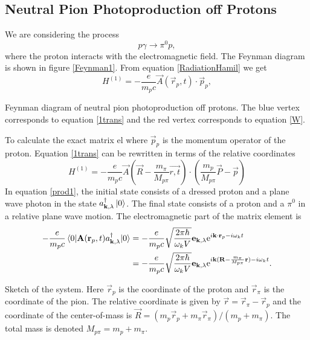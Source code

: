 \subsection{Neutral Pion Photoproduction off Protons}\label{sec:NeutralOffProton}
We are considering the process
\begin{equation} \label{prod1}
	p\gamma \rightarrow \pi^0 p,
\end{equation}
where the proton interacts with the electromagnetic field. The Feynman diagram is shown in figure \ref{Feynman1}. From equation \eqref{RadiationHamil} we get
\begin{equation} \label{1trans}
	H^{(1)} = -\frac{e}{m_pc} \vec{A}(\vec{r}_p,t)\cdot \vec{p}_p,
\end{equation}
\begin{marginfigure}
	\centering
	
	\caption{Feynman diagram of neutral pion photoproduction off protons. The blue vertex corresponds to equation \eqref{1trans} and the red vertex corresponds to equation \eqref{W}.}
	\label{Feynman1}
\end{marginfigure} 
To calculate the exact matrix el
where $\vec{p}_p$ is the momentum operator of the proton.  Equation \eqref{1trans} can be rewritten in terms of the relative coordinates
\begin{equation} \label{1rela}
	H^{(1)} = -\frac{e}{m_p c}\vec{A}\left( \vec{R}-\frac{m_\pi}{M_{p\pi}}\vec{r,t}\right) \cdot \left( \frac{m_p}{M_{p\pi}}\vec{P}-\vec{p}\right)
\end{equation}
In equation \eqref{prod1}, the initial state consists of a dressed proton and a plane wave photon in the state $a_{\bm{\mathrm{k}},\lambda}^\dagger\ket{0}$. The final state consists of a proton and a $\pi^0$ in a relative plane wave motion. The electromagnetic part of the matrix element is
\begin{align} \label{eletrans}
	-\frac{e}{m_p c}\mel{0}{\bm{\mathrm{A}}(\bm{\mathrm{r}}_p,t)a^\dagger_{\bm{\mathrm{k}},\lambda}}{0} &= -\frac{e}{m_p c}\sqrt{\frac{2\pi\hbar}{\omega_k V}}\bm{\mathrm{e}}_{\bm{\mathrm{k}},\lambda} \text{e}^{i\bm{\mathrm{k}}\cdot \bm{\mathrm{r}}_p-i\omega_k t} \\
	&=  -\frac{e}{m_p c}\sqrt{\frac{2\pi\hbar}{\omega_k V}}\bm{\mathrm{e}}_{\bm{\mathrm{k}},\lambda} \text{e}^{i\bm{\mathrm{k}}( \bm{\mathrm{R}}-\frac{m_\pi}{M_{p\pi}}\bm{\mathrm{r}})-i\omega_k t}.
\end{align}
\begin{marginfigure}
	\centering
	
	\caption{Sketch of the system. Here $\vec{r}_p$ is the coordinate of the proton and $\vec{r}_\pi$ is the coordinate of the pion. The relative coordinate is given by $\vec{r}=\vec{r}_\pi-\vec{r}_p$ and the coordinate of the center-of-mass is $\vec{R}=(m_p \vec{r}_p+m_\pi\vec{r}_\pi)/(m_p+m_\pi)$. The total mass is denoted $M_{p\pi}=m_p+m_\pi$.}
	\label{JacobiIllustrationProton}
\end{marginfigure}
